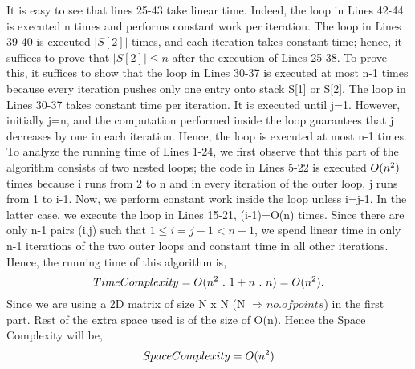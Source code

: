 \documentclass{article}
\begin{document}
  It is easy to see that lines 25-43 take linear time. Indeed, the loop in Lines 42-44 is executed n times and performs constant work per iteration. The loop in Lines 39-40 is executed $\vert S[2]\vert $ times, and each iteration takes constant time; hence, it suffices to prove that $ \vert S[2]\vert \leq n $ after the execution of Lines 25-38. To prove this, it suffices to show that the loop in Lines 30-37 is executed at most n-1 times because every iteration pushes only one entry onto stack S[1] or S[2]. The loop in Lines 30-37 takes constant time per iteration. It is executed until j=1. However, initially j=n, and the computation performed inside the loop guarantees that j decreases by one in each iteration. Hence, the loop is executed at most n-1 times. To analyze the running time of Lines 1-24, we first observe that this part of the algorithm consists of two nested loops; the code in Lines 5-22 is executed $O(n\textsuperscript{2} )$ times because i runs from 2 to n and in every iteration of the outer loop, j runs from 1 to i-1. Now, we perform constant work inside the loop unless i=j-1. In the latter case, we execute the loop in Lines 15-21, (i-1)=O(n) times. Since there are only n-1 pairs (i,j) such that
$1\leq i=j-1 < n-1$, we spend linear time in only n-1 iterations of the two outer loops and constant time in all other iterations. Hence, the running time of this algorithm is,
  \begin{equation*}
 	 Time Complexity=O(n\textsuperscript{2}\ .\ 1 + n\ .\ n) = O(n\textsuperscript{2} ).	 
  \end{equation*}
Since we are using a 2D matrix of size N x N (N $\Longrightarrow no. of points$) in the first part. Rest of the extra space used is of the size of O(n). Hence the Space Complexity will be,
  \begin{equation*}
 	 Space Complexity=O(n\textsuperscript{2})	 
  \end{equation*}
   
\end{document}

